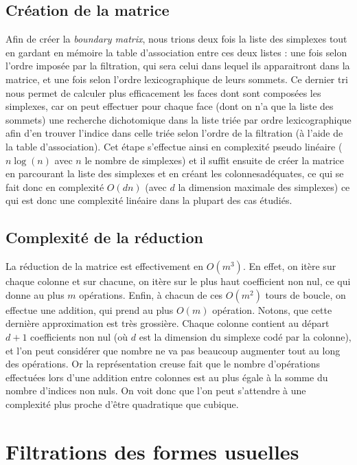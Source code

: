 \documentclass[french, a4paper, 12pt]{article}
\begin{document}
\subsection{Création de la matrice}

Afin de créer la \textit{boundary matrix}, nous trions deux fois
la liste des simplexes tout en gardant en mémoire la table 
d’association entre ces deux listes : une fois selon l'ordre 
imposée par la filtration, qui sera celui dans lequel ils 
apparaitront dans la matrice, et une fois selon l'ordre 
lexicographique de leurs sommets. Ce dernier tri nous permet de 
calculer plus efficacement les faces dont sont composées les
simplexes, car on peut effectuer pour chaque face (dont on n'a que
la liste des sommets) une recherche dichotomique dans la liste 
triée par ordre lexicographique afin d'en trouver l'indice dans 
celle triée selon l'ordre de la filtration (à l'aide de la table
d'association). Cet étape s'effectue ainsi en complexité pseudo
linéaire ($n\log(n)$ avec $n$ le nombre de simplexes) et il suffit 
ensuite de créer la matrice en parcourant la liste des simplexes 
et en créant les colonnesadéquates, ce qui se fait donc en 
complexité $O(dn)$ (avec $d$ la dimension maximale des simplexes)
ce qui est donc une complexité linéaire dans la plupart des cas
étudiés.

\subsection{Complexité de la réduction}

La réduction de la matrice est effectivement en $O(m^3 )$. En 
effet, on itère sur chaque colonne et sur chacune, on itère sur le 
plus haut coefficient non nul, ce qui donne au plus $m$ opérations. 
Enfin, à chacun de ces $O(m^2 )$ tours de boucle, on effectue une 
addition, qui prend au plus $O(m)$ opération. Notons, que cette 
dernière approximation est très grossière. Chaque colonne contient 
au départ $d+1$ coefficients non nul (où $d$ est la dimension du 
simplexe codé par la colonne), et l’on peut considérer que nombre
ne va pas beaucoup augmenter tout au long des opérations. Or la 
représentation creuse fait que le nombre d’opérations effectuées 
lors d’une addition entre colonnes est au plus égale à la somme du 
nombre d’indices non nuls. On voit donc que l’on peut s’attendre à 
une complexité plus proche d’être quadratique que cubique.

\section{Filtrations des formes usuelles}
\end{document}

